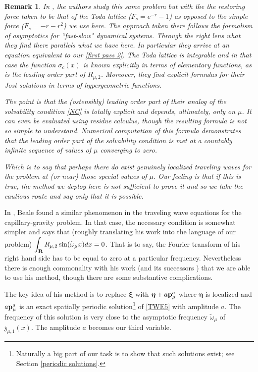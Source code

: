 \documentclass[12pt]{amsart}
\numberwithin{equation}{section}
\newtheorem{remark}[theorem]{Remark}
\newcommand{\ds}{\displaystyle}
\newcommand{\R}{{\bf{R}}}
\newcommand{\pb}{{\bf{p}}}
\newcommand{\muo}{{\mu,1}}
\newcommand{\xib}{{\boldsymbol \xi}}
\newcommand{\etab}{{\boldsymbol \eta}}
\renewcommand{\tilde}{\widetilde}
\begin{document}
\begin{remark}\label{AY}
In \cite{VSWP}, the authors study this same problem but with the the restoring force taken to be that of the Toda lattice ($F_{s} = e^{-r}-1$)
as opposed to the simple force  ($F_s=-r-r^2$) we use here. The approach taken there follows the formalism of asymptotics for ``fast-slow" dynamical systems. Through the right lens what they find there  parallels what we have here. In particular they arrive at an equation equivalent to our \eqref{first pass 2}.
The Toda lattice is integrable and in that case the function $\sigma_c(x)$
is known explicitly in terms of elementary functions, as is the leading order part of $R_{\mu,2}$.
 Moreover, they find explicit formulas for their Jost solutions 
in terms of hypergeometric functions. 

The point is that the (ostensibly) leading order part of 
their analog of the solvability condition
\eqref{NC}
is totally explicit and depends, ultimately,
only on $\mu$. It can even be evaluated
using residue calculus, though the resulting formula is not so simple to understand. 
Numerical computation of this formula demonstrates that  the leading order part of the solvability
condition is met at a countably infinite sequence of values of $\mu$ converging to zero. 

Which is to say that perhaps there do exist genuinely localized
traveling waves for the problem at (or near) those special values of $\mu$. 
Our feeling is that if this is true, the method we deploy here is not sufficient
to prove it and so we take the cautious route and say only that it is possible.
\end{remark}


In \cite{beale2}, Beale found a similar phenomenon in the traveling wave equations for the capillary-gravity problem. In that case, the necessary condition is somewhat simpler and 
says that (roughly translating his work
into the language of our problem)
$\ds \int_\R R_{\mu,2} \sin( \tilde{\omega}_\mu x)dx = 0$. That is to say, the Fourier transform of his right hand side  has to be equal to zero at a particular frequency.
Nevertheless there is enough commonality with his work (and its successors \cite{amick-toland} \cite{FW}) that we are able to use his method, though there are some substantive complications.

The key idea of his method is to replace $\xib$ with $\etab+a \pb_\mu^a$ where $\etab$ is localized and 
$a \pb_\mu^a$ is an exact spatially periodic solution\footnote{Naturally a big part of our task is to show that such solutions exist; see Section \ref{periodic solutions}.} of \eqref{TWE5}
with amplitude $a$.
The frequency of this solution is very close to the asymptotic frequency $\tilde{\omega}_\mu$ of ${\mathfrak{z}}_\muo(x)$. The amplitude $a$ becomes our third variable.
\end{document}
